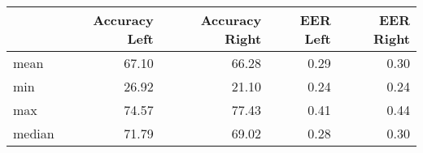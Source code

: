 \begin{tabular}{lrrrr}
\toprule
{} &  Accuracy Left &  Accuracy Right &  EER Left &  EER Right \\
\midrule
mean   &          67.10 &           66.28 &      0.29 &       0.30 \\
min    &          26.92 &           21.10 &      0.24 &       0.24 \\
max    &          74.57 &           77.43 &      0.41 &       0.44 \\
median &          71.79 &           69.02 &      0.28 &       0.30 \\
\bottomrule
\end{tabular}
